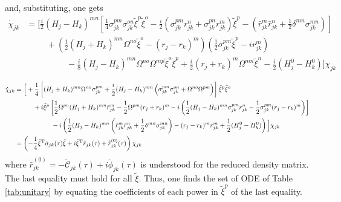 \documentclass[%
reprint,
superscriptaddress,
nofootinbib,
 amsmath,amssymb,
prx,
floatfix,
]{revtex4-2}
\begin{document}
and, substituting, one gets
 \begin{align*}
     \dot{\chi}_{jk} &= \Big[ \frac{i}{2} (H_j - H_k)^{mn} \left[ \frac{1}{4} \sigma_{jk}^{pm}  \sigma_{jk}^{on} \tilde{\xi}^{p} \tilde{\xi}^{o} - \frac{i}{2} (\sigma_{jk}^{pm}  r^n_{jk} +  \sigma_{jk}^{pn}  r^m_{jk} ) \tilde{\xi}^{p}  - \left(\bar{r}_{jk}^m \bar{r}_{jk}^n + \frac{1}{2}  \delta^{mn} \sigma_{jk}^{mn} \right) \right] 
     \\
     &\hspace{1cm}
    + \left(  \frac{1}{2}  ( H_j + H_k )^{mn} \Omega^{n o} \tilde{\xi}^o  - (r_j - r_k)^m \right)  \left( \frac{1}{2} \sigma_{jk}^{pm} \tilde{\xi}^{p} -  i r^m_{jk}  \right)  
     \\
     &\hspace{2cm }
     - \frac{i}{8} (H_j - H_k)^{mn} \Omega^{n o} \Omega^{m p} \tilde{\xi}^o \tilde{\xi}^p  + \frac{i}{2} (r_j + r_k)^m  \Omega^{mn} \tilde{\xi}^n - \frac{i}{2} (H_j^0-H_k^0) \Big] \chi_{jk} 
     \\
\end{align*}
\begin{align*}
     \dot{\chi}_{jk} &= \Big[ +  \frac{1}{4} 
     \left[ ( H_j + H_k )^{mn} \Omega^{no}  \sigma_{jk}^{pm}  +    \frac{i}{2} (H_j - H_k)^{mn} \left( \sigma_{jk}^{pm}  \sigma_{jk}^{on} +  \Omega^{n o} \Omega^{pm}  \right)   \right] \tilde{\xi}^{p} \tilde{\xi}^{o}  
     \\
     &\hspace{1cm} 
     +   i \tilde{\xi}^p  \left[   \frac{1}{2} \Omega^{p  n} ( H_j + H_k )^{nm}  \bar{r}_{jk}^m    - \frac{1}{2}\Omega^{p m}  (r_j + r_k)^m  - i  \left( \frac{1}{2} (H_j - H_k)^{mn}  \sigma_{jk}^{pm}  r^n_{jk}  -   \frac{1}{2} \sigma_{jk}^{pm} (r_j - r_k)^m \right) \right]  
     \\
     &\hspace{2cm} 
     -  i \left(  \frac{1}{2} (H_j - H_k)^{mn} \left(\bar{r}_{jk}^m \bar{r}_{jk}^n + \frac{1}{2}  \delta^{mn} \sigma_{jk}^{mn} \right) - (r_j - r_k)^m  r^m_{jk}  + \frac{1}{2} (H_j^0-H_k^0)  \right) \Big] \chi_{jk} \\
    &= \left( -\frac{1}{4} \tilde{\xi}^{\rm T} \dot{\sigma}_{jk} (\tau) \tilde{\xi}  +  i \tilde{\xi}^{\rm T} \dot{\bar{r}}_{jk} (\tau) + \dot{\bar{r}}_{jk}^{(0)}(\tau) \right) \chi_{jk} 
\end{align*}
where $\dot{\bar{r}}_{jk}^{(0)} = - \dot{\mathcal{C}}_{jk} (\tau) + i \dot{\phi}_{jk} (\tau)$ is understood for the reduced density matrix. The last equality must hold for all $\tilde{\xi}$. Thus, one finds the set of ODE of Table \ref{tab:unitary} by equating the coefficients of each power in $\tilde{\xi}^p$ of the last equality. %
\end{document}
